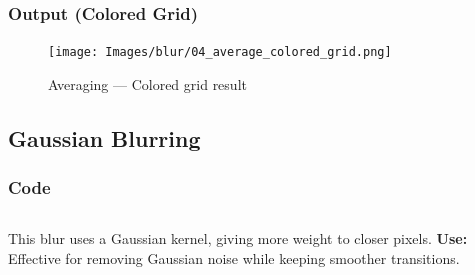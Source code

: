 \documentclass[a4paper,11pt]{article}
\begin{document}
		\subsubsection*{Output (Colored Grid)}
	\begin{figure}[H]
		\centering
		\texttt{[image: Images/blur/04\_average\_colored\_grid.png]}
		\caption{Averaging — Colored grid result}
	\end{figure}
	\clearpage
	
	\subsection{Gaussian Blurring}
	\subsubsection*{Code}
	\inputminted{python}{Python_Files/05_gauss_blur.py}
	
	This blur uses a Gaussian kernel, giving more weight to closer pixels.  
	\textbf{Use:} Effective for removing Gaussian noise while keeping smoother transitions.
	

	
\end{document}

